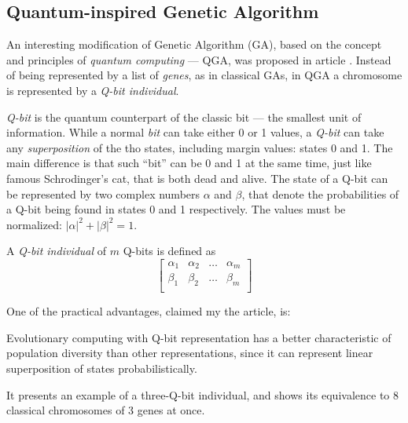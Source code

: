 \documentclass[../ThesisDoc]{subfiles}
\begin{document}
\providecommand{\rootdir}{..}



\subsection{Quantum-inspired Genetic Algorithm}
An interesting modification of Genetic Algorithm (GA), based on the concept and
principles of \emph{quantum computing} --- QGA, was proposed in article
\cite{QuantumGeneticAlgorithm}.
Instead of being represented by a list of \emph{genes}, as in classical GAs,
in QGA a chromosome is represented by a \emph{Q-bit individual}.

\emph{Q-bit} is the quantum counterpart of the classic bit --- the smallest
unit of information. While a normal \emph{bit} can take either 0 or 1 values,
a \emph{Q-bit} can take any \emph{superposition} of the tho states, including
margin values: states 0 and 1. The main difference is that such ``bit'' can be
0 and 1 at the same time, just like famous Schrodinger's cat, that is both dead
and alive. The state of a Q-bit can be represented by two complex numbers
$\alpha$ and $\beta$, that denote the probabilities of a Q-bit being found in
states 0 and 1 respectively.
The values must be normalized: $|\alpha|^2 + |\beta|^2 = 1$.

A \emph{Q-bit individual} of $m$ Q-bits is defined as
\begin{equation}
\left[
  \begin{array}{cccc}
  \alpha_1 & \alpha_2 & \dots & \alpha_m \\
  \beta_1  & \beta_2  & \dots & \beta_m  \\
  \end{array}
\right]
\end{equation}

One of the practical advantages, claimed my the article, is:
\begin{displayquote}
  Evolutionary computing with Q­-bit representation has a better characteristic
  of population diversity than other representations, since it can represent
  linear superposition of states probabilistically.
\end{displayquote}
It presents an example of a three-Q-bit individual, and shows its equivalence
to 8 classical chromosomes of 3 genes at once.
\end{document}
